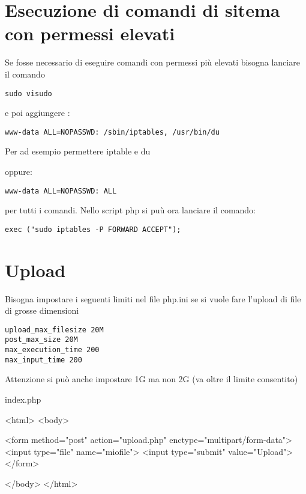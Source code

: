 \documentclass[]{article}
\newenvironment{Shaded}{}{}
\newcommand{\StringTok}[1]{\textcolor[rgb]{0.25,0.44,0.63}{{#1}}}
\newcommand{\NormalTok}[1]{{#1}}
\begin{document}
\section{Esecuzione di comandi di sitema con permessi
elevati}\label{esecuzione-di-comandi-di-sitema-con-permessi-elevati}

Se fosse necessario di eseguire comandi con permessi più elevati bisogna
lanciare il comando

\begin{verbatim}
sudo visudo 
\end{verbatim}

e poi aggiungere :

\begin{verbatim}
www-data ALL=NOPASSWD: /sbin/iptables, /usr/bin/du
\end{verbatim}

Per ad esempio permettere iptable e du

oppure:

\begin{verbatim}
www-data ALL=NOPASSWD: ALL
\end{verbatim}

per tutti i comandi. Nello script php si puù ora lanciare il comando:

\begin{verbatim}
exec ("sudo iptables -P FORWARD ACCEPT");
\end{verbatim}

\section{Upload}\label{upload}

Bisogna impostare i seguenti limiti nel file php.ini se si vuole fare
l'upload di file di grosse dimensioni

\begin{verbatim}
upload_max_filesize 20M
post_max_size 20M
max_execution_time 200
max_input_time 200
\end{verbatim}

Attenzione si può anche impostare 1G ma non 2G (va oltre il limite
consentito)

index.php

\begin{Shaded}
\begin{Highlighting}[]
\NormalTok{<html>}
\NormalTok{<body>}

\NormalTok{<form method=}\StringTok{"post"} \NormalTok{action=}\StringTok{"upload.php"} \NormalTok{enctype=}\StringTok{"multipart/form-data"}\NormalTok{>}
    \NormalTok{<input type=}\StringTok{"file"} \NormalTok{name=}\StringTok{"miofile"}\NormalTok{>}
    \NormalTok{<input type=}\StringTok{"submit"} \NormalTok{value=}\StringTok{"Upload"}\NormalTok{>}
\NormalTok{</form>}

\NormalTok{</body>}
\NormalTok{</html>}
\end{Highlighting}
\end{Shaded}
\end{document}
